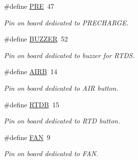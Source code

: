 \begin{DoxyCompactItemize}
\mbox{\label{group___board__model__group_ga349316092037fdd0773335fab4e15ee8}} 
\#define \mbox{\hyperlink{group___board__model__group_ga349316092037fdd0773335fab4e15ee8}{P\+RE}}~47
\begin{DoxyCompactList}\small\item\em Pin on board dedicated to P\+R\+E\+C\+H\+A\+R\+GE. \end{DoxyCompactList}\item 
\mbox{\label{group___board__model__group_ga145103118f6d9d1129aa4509cf214a13}} 
\#define \mbox{\hyperlink{group___board__model__group_ga145103118f6d9d1129aa4509cf214a13}{B\+U\+Z\+Z\+ER}}~52
\begin{DoxyCompactList}\small\item\em Pin on board dedicated to buzzer for R\+T\+DS. \end{DoxyCompactList}\item 
\mbox{\label{group___board__model__group_ga78a99c4f7bcb7723d7bf21810c4ce09b}} 
\#define \mbox{\hyperlink{group___board__model__group_ga78a99c4f7bcb7723d7bf21810c4ce09b}{A\+I\+RB}}~14
\begin{DoxyCompactList}\small\item\em Pin on board dedicated to A\+IR button. \end{DoxyCompactList}\item 
\mbox{\label{group___board__model__group_ga1bcd7461cf494d3235f792bf3d814923}} 
\#define \mbox{\hyperlink{group___board__model__group_ga1bcd7461cf494d3235f792bf3d814923}{R\+T\+DB}}~15
\begin{DoxyCompactList}\small\item\em Pin on board dedicated to R\+TD button. \end{DoxyCompactList}\item 
\mbox{\label{group___board__model__group_gacd9448edb89c378d843fc3cb93a098d3}} 
\#define \mbox{\hyperlink{group___board__model__group_gacd9448edb89c378d843fc3cb93a098d3}{F\+AN}}~9
\begin{DoxyCompactList}\small\item\em Pin on board dedicated to F\+AN. \end{DoxyCompactList}\item 

\end{DoxyCompactItemize}

